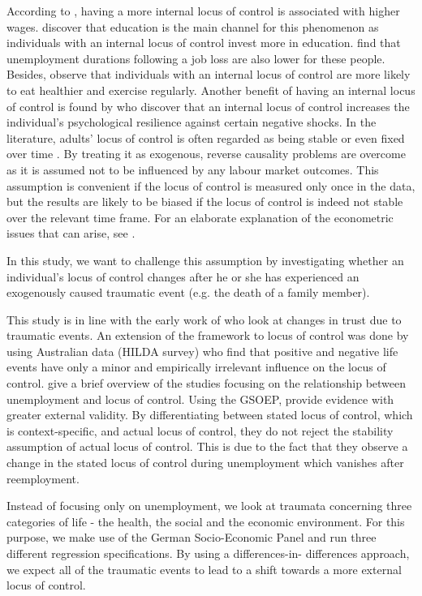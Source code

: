 \documentclass[12pt, a4paper, fleqn, parskip]{scrartcl}
\begin{document}
According to \citet{heineck2010}, having a more internal locus of control is associated
with higher wages. \citet{piatek2010} discover that education is the main channel for
this phenomenon as individuals with an internal locus of control invest more in
education. \citet{gallo2003} find that unemployment durations following a job loss are
also lower for these people. Besides, \citet{cobb2014} observe that individuals with an
internal locus of control are more likely to eat healthier and exercise regularly.
Another benefit of having an internal locus of control is found by
\citet{buddelmeyer2016} who discover that an internal locus of control increases the
individual's psychological resilience against certain negative shocks. In the
literature, adults' locus of control is often regarded as being stable or even fixed
over time \citep{heineck2010,semykina2007}. By treating it as exogenous, reverse
causality problems are overcome as it is assumed not to be influenced by any labour
market outcomes. This assumption is convenient if the locus of control is measured only
once in the data, but the results are likely to be biased if the locus of control is
indeed not stable over the relevant time frame. For an elaborate explanation of the
econometric issues that can arise, see \citet{cobb2013}.

In this study, we want to challenge this assumption by investigating whether an
individual's locus of control changes after he or she has experienced an exogenously
caused traumatic event (e.g. the death of a family member).

This study is in line with the early work of \citet{alesina2002} who look at changes in
trust due to traumatic events. An extension of the framework to locus of control was
done by \citet{cobb2013} using Australian data (HILDA survey) who find that positive and
negative life events have only a minor and empirically irrelevant  influence on the
locus of control. \citet{preuss2017} give a brief overview of the studies focusing on
the relationship between unemployment and locus of control. Using the GSOEP,
\citet{preuss2017} provide evidence with greater external validity. By differentiating
between stated locus of control, which is context-specific, and actual locus of control,
they do not reject the stability assumption of actual locus of control. This is due to
the fact that they observe a change in the stated locus of control during unemployment
which vanishes after reemployment.

Instead of focusing only on unemployment, we look at traumata concerning three
categories of life - the health, the social and the economic environment.  For this
purpose, we make use of the German Socio-Economic Panel \citep{gsoep2017} and run three
different regression specifications. By using a differences-in- differences approach, we
expect all of the traumatic events to lead to a shift towards a more external locus of
control.
\end{document}
